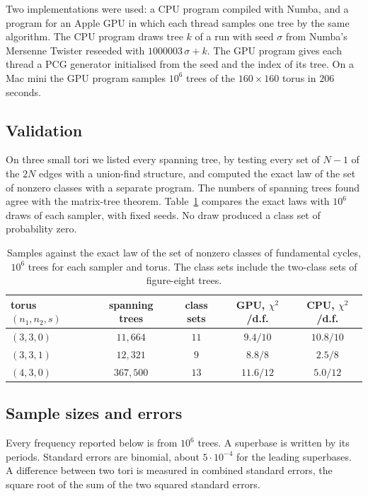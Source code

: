 \documentclass[11pt]{amsart}
\theoremstyle{definition}
\theoremstyle{remark}
\begin{document}
Two implementations were used: a CPU program compiled with Numba, and a program for an Apple GPU in which each thread
samples one tree by the same algorithm. The CPU program draws tree $k$ of a run with seed $\sigma$ from Numba's Mersenne
Twister reseeded with $1000003\,\sigma+k$. The GPU program gives each thread a PCG generator initialised from the seed
and the index of its tree. On a Mac mini the GPU program samples $10^6$ trees of the $160\times160$ torus in $206$
seconds.

\subsection*{Validation}
On three small tori we listed every spanning tree, by testing every set of $N-1$ of the $2N$ edges with a union-find
structure, and computed the exact law of the set of nonzero classes with a separate program. The numbers of spanning
trees found agree with the matrix-tree theorem. Table~\ref{tab:exact} compares the exact laws with $10^6$ draws of
each sampler, with fixed seeds. No draw produced a class set of probability zero.

\begin{table}[tbp]
\centering
\small
\begin{tabular}{lcccc}
\toprule
torus $(n_1,n_2,s)$ & spanning trees & class sets & GPU, $\chi^2$/d.f. & CPU, $\chi^2$/d.f.\\\midrule
$(3,3,0)$ & $11{,}664$ & $11$ & $9.4/10$ & $10.8/10$\\
$(3,3,1)$ & $12{,}321$ & $9$ & $8.8/8$ & $2.5/8$\\
$(4,3,0)$ & $367{,}500$ & $13$ & $11.6/12$ & $5.0/12$\\\bottomrule
\end{tabular}
\medskip
\caption{Samples against the exact law of the set of nonzero classes of fundamental cycles, $10^6$ trees for each
sampler and torus. The class sets include the two-class sets of figure-eight trees.}
\label{tab:exact}
\end{table}

\subsection*{Sample sizes and errors}
Every frequency reported below is from $10^6$ trees. A superbase is written by its periods. Standard errors are
binomial, about $5\cdot10^{-4}$ for the leading superbases. A difference between two tori is measured in combined
standard errors, the square root of the sum of the two squared standard errors.
\end{document}
